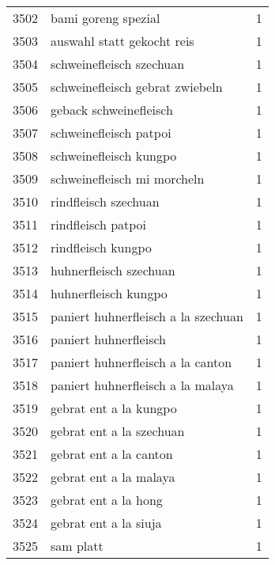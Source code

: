 \begin{tabular}{llr}
3502 &                                bami goreng spezial &      1 \\
3503 &                         auswahl statt gekocht reis &      1 \\
3504 &                           schweinefleisch szechuan &      1 \\
3505 &                    schweinefleisch gebrat zwiebeln &      1 \\
3506 &                             geback schweinefleisch &      1 \\
3507 &                             schweinefleisch patpoi &      1 \\
3508 &                             schweinefleisch kungpo &      1 \\
3509 &                        schweinefleisch mi morcheln &      1 \\
3510 &                               rindfleisch szechuan &      1 \\
3511 &                                 rindfleisch patpoi &      1 \\
3512 &                                 rindfleisch kungpo &      1 \\
3513 &                             huhnerfleisch szechuan &      1 \\
3514 &                               huhnerfleisch kungpo &      1 \\
3515 &                paniert huhnerfleisch a la szechuan &      1 \\
3516 &                              paniert huhnerfleisch &      1 \\
3517 &                  paniert huhnerfleisch a la canton &      1 \\
3518 &                  paniert huhnerfleisch a la malaya &      1 \\
3519 &                             gebrat ent a la kungpo &      1 \\
3520 &                           gebrat ent a la szechuan &      1 \\
3521 &                             gebrat ent a la canton &      1 \\
3522 &                             gebrat ent a la malaya &      1 \\
3523 &                               gebrat ent a la hong &      1 \\
3524 &                              gebrat ent a la siuja &      1 \\
3525 &                                          sam platt &      1 \\

\end{tabular}
